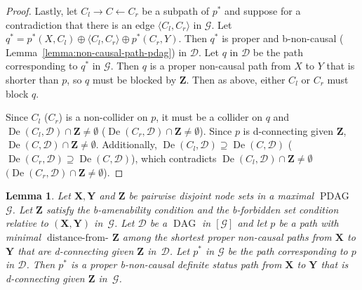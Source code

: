 \documentclass[letterpaper]{article}
\newtheorem{lemma}[theorem]{Lemma}
\theoremstyle{definition}
\theoremstyle{remark}
\DeclareMathOperator{\PDAG}{PDAG}
\DeclareMathOperator{\DAG}{DAG}
\DeclareMathOperator{\De}{De}
\DeclareMathOperator{\distancefrom}{distance-from-\!}
\newcommand{\bamen}{the b-amenability condition}
\newcommand{\bforb}{the b-forbidden set condition}
\newcommand{\mpdag}{maximal $\PDAG$}
\newcommand{\g}[1][G]{\mathcal{#1}}
\newcommand{\pstar}[1][p]{{#1}^{*}}
\begin{document}
\begin{proof}
Lastly, let $C_l \rightarrow C \leftarrow C_r$ be a subpath of $\pstar$ and suppose for a contradiction that there is an edge $\langle C_l,C_r\rangle$ in $\g$. Let $\pstar[q] = \pstar(X,C_l)\oplus \langle C_l,C_r\rangle \oplus \pstar(C_r,Y)$. Then $\pstar[q]$ is proper and b-non-causal ( Lemma~\ref{lemma:non-causal-path-pdag}) in $\g[D]$. Let $q$ in $\g[D]$ be the path corresponding to $\pstar[q]$ in $\g$. Then $q$ is a proper non-causal path from $X$ to $Y$ that is shorter than $p$, so $q$ must be blocked by $\mathbf{Z}$. Then as above, either $C_l$ or $C_r$ must block $q$. 

Since $C_l$ ($C_r$) is a non-collider on $p$, it must be a collider on $q$ and $\De(C_l,\g[D]) \cap \mathbf{Z} \neq \emptyset$ ($\De(C_r,\g[D]) \cap \mathbf{Z} \neq \emptyset$). Since $p$ is d-connecting given $\mathbf{Z}$, $\De(C,\g[D]) \cap \mathbf{Z} \neq \emptyset$. Additionally, $\De(C_l,\g[D]) \supseteq \De(C,\g[D])$ ($\De(C_r,\g[D]) \supseteq \De(C,\g[D])$), which contradicts $\De(C_l,\g[D]) \cap \mathbf{Z} \neq \emptyset$ $(\De(C_r,\g[D]) \cap \mathbf{Z} \neq \emptyset$).
\end{proof}

\begin{lemma}
 Let $\mathbf{X,Y}$ and $\mathbf{Z}$ be pairwise disjoint node sets in a \mpdag{} $\g$. Let $\mathbf{Z}$ satisfy \bamen{} and \bforb{} relative to $(\mathbf{X},\mathbf{Y})$ in~$\g$. Let $\g[D]$ be a $\DAG$ in $[\g]$ and let $p$ be a path with minimal $\distancefrom{\mathbf{Z}}$ among the shortest proper non-causal paths from $\mathbf{X}$ to $\mathbf{Y}$ that are d-connecting given $\mathbf{Z}$ in~$\g[D]$. Let $\pstar$ in $\g$ be the path corresponding to $p$ in $\g[D]$. Then $\pstar$ is a proper b-non-causal definite status path from $\mathbf{X}$ to $\mathbf{Y}$ that is d-connecting given $\mathbf{Z}$ in~$\g$.
   \label{lemma:2-pdag}
\end{lemma}
\end{document}
